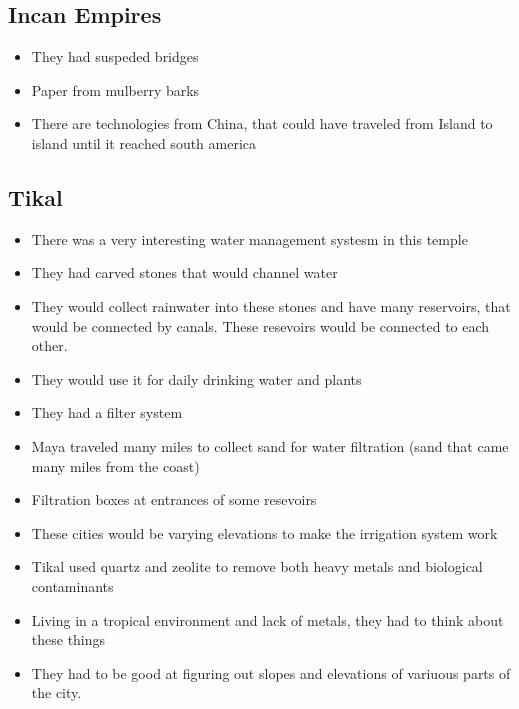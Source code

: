 \documentclass{article}
\begin{document}
\subsection{Incan Empires}
\begin{itemize}
  \item They had suspeded bridges
  \item Paper from mulberry barks
  \item There are technologies from China, that could have traveled from Island to island
    until it reached south america
\end{itemize}

\subsection{Tikal}
\begin{itemize}
  \item There was a very interesting water management systesm in this temple
  \item They had carved stones that would channel water
  \item They would collect rainwater into these stones
    and have many reservoirs,
    that would be connected by canals.
    These resevoirs would be connected to each other.
  \item They would use it for daily drinking water and plants
  \item They had a filter system
  \item Maya traveled many miles to collect sand for water filtration
    (sand that came many miles from the coast)
  \item Filtration boxes at entrances of some resevoirs
  \item These cities would be varying elevations to make the irrigation system work
  \item Tikal used quartz and zeolite to remove both heavy metals and biological contaminants
  \item Living in a tropical environment and lack of metals, they had to think about
    these things
  \item They had to be good at figuring out slopes and elevations of variuous parts
    of the city.
\end{itemize}
\end{document}
